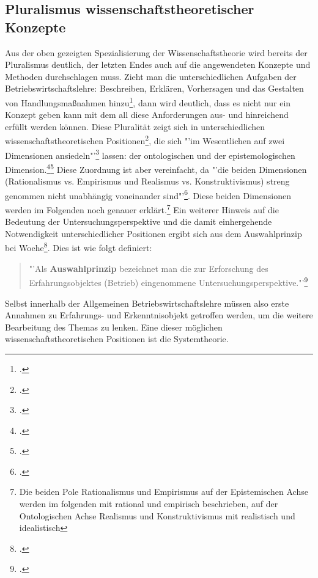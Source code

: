 \documentclass[a4paper,12pt]{article}
\begin{document}
\subsection{Pluralismus wissenschaftstheoretischer Konzepte}\label{plural}
Aus der oben gezeigten Spezialisierung der Wissenschaftstheorie wird bereits der Pluralismus deutlich, der letzten Endes auch auf die angewendeten Konzepte und Methoden durchschlagen muss. Zieht man die unterschiedlichen Aufgaben der Betriebswirtschaftslehre: Beschreiben, Erklären, Vorhersagen und das Gestalten von Handlungsmaßnahmen hinzu\footcite[S. 25]{Helfrich2024}, dann wird deutlich, dass es nicht nur ein Konzept geben kann mit dem all diese Anforderungen aus- und hinreichend erfüllt werden können. Diese Pluralität zeigt sich in unterschiedlichen wissenschaftstheoretischen Positionen\footcite[S. 93]{Helfrich2024}, die sich "'im Wesentlichen auf zwei Dimensionen ansiedeln"'\footcite[S. 94]{Helfrich2024} lassen: der ontologischen und der epistemologischen Dimension.\footcite[S. 94]{Helfrich2024}\footcite[S. 29]{Kornmeier2007} Diese Zuordnung ist aber vereinfacht, da "'die beiden Dimensionen (Rationalismus vs. Empirismus und Realismus vs. Konstruktivismus) streng genommen nicht unabhängig voneinander sind"'\footcite[S. 29]{Kornmeier2007}. Diese beiden Dimensionen werden im Folgenden noch genauer erklärt.\footnote{Die beiden Pole Rationalismus und Empirismus auf der Epistemischen Achse werden im folgenden mit rational und empirisch beschrieben, auf der Ontologischen Achse Realismus und Konstruktivismus mit realistisch und idealistisch}
Ein weiterer Hinweis auf die Bedeutung der Untersuchungsperspektive und die damit einhergehende Notwendigkeit unterschiedlicher Positionen ergibt sich aus dem Auswahlprinzip bei Woehe\footcite[S. 38]{Woehe2008}. Dies ist wie folgt definiert:
\begin{quote}
"'Als \textbf{Auswahlprinzip} bezeichnet man die zur Erforschung des Erfahrungsobjektes (Betrieb) eingenommene Untersuchungsperspektive."'\footcite[S. 38]{Woehe2008}    
\end{quote} 
Selbst innerhalb der Allgemeinen Betriebswirtschaftslehre müssen also erste Annahmen zu Erfahrungs- und Erkenntnisobjekt getroffen werden, um die weitere Bearbeitung des Themas zu lenken. Eine dieser möglichen wissenschaftstheoretischen Positionen ist die Systemtheorie.
\end{document}
